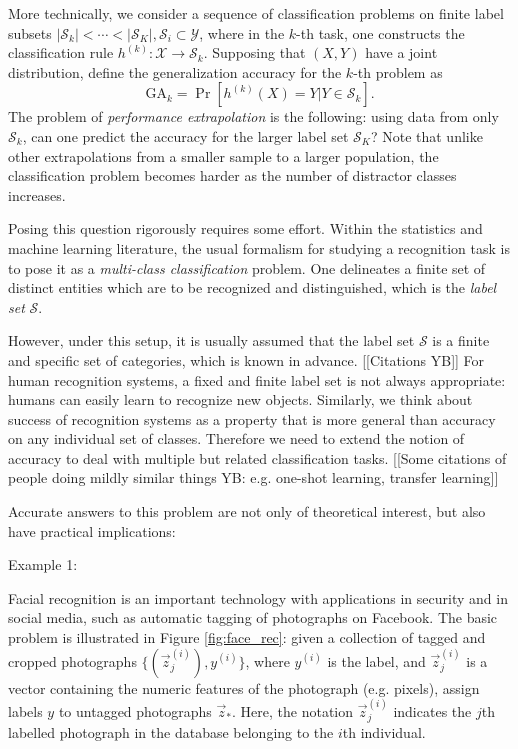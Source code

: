 \documentclass[12pt]{article}
\begin{document}
More technically, we consider a sequence of classification
problems on finite label subsets
$|\mathcal{S}_k| < \cdots < |\mathcal{S}_K|, \mathcal{S}_i \subset \mathcal{Y}$,
where in the $k$-th task, one constructs the classification rule
$h^{(k)}:\mathcal{X} \to \mathcal{S}_k$.  Supposing that $(X, Y)$ have
a joint distribution, define the generalization accuracy for the
$k$-th problem as
\begin{equation}\label{eq:ga_k}
\text{GA}_k = \Pr[h^{(k)}(X) = Y|Y \in \mathcal{S}_k].
\end{equation}
The problem of \emph{performance extrapolation} is the following: using data
from only $\mathcal{S}_k$, can one predict the accuracy 
 for the larger label set $\mathcal{S}_K$?
Note that unlike other extrapolations from a smaller sample to a larger population, 
the classification problem becomes harder as the number of distractor classes
increases. 

Posing this question rigorously requires some effort. 
Within the statistics and machine learning literature, the usual
formalism for studying a recognition task is to pose it as a
\emph{multi-class classification} problem.  One delineates a finite
set of distinct entities which are to be recognized and distinguished,
which is the \emph{label set} $\mathcal{S}$. 

However, under this setup, it is usually assumed that the
label set $\mathcal{S}$ is a finite and specific set of categories, which is known in advance. [[Citations YB]] For human recognition systems, a fixed and finite label set is not always appropriate: humans can easily learn to recognize new objects. Similarly, we think about success of recognition systems as a property that is more general than accuracy on any individual set of classes. Therefore we need to extend the notion of accuracy to deal with multiple but related classification tasks.
[[Some citations of people doing mildly similar things YB: e.g. one-shot learning, transfer learning]] 


Accurate answers to this problem are not only of theoretical interest, but also have practical implications:

Example 1:

Facial recognition is an important technology with applications in
security and in social media, such as automatic tagging of photographs
on Facebook.  The basic problem is illustrated in Figure
\ref{fig:face_rec}: given a collection of tagged and cropped
photographs $\{(\vec{z}_j^{(i)}), y^{(i)}\}$, where $y^{(i)}$ is the
label, and $\vec{z}_j^{(i)}$ is a vector containing the numeric
features of the photograph (e.g. pixels), assign labels $y$ to
untagged photographs $\vec{z}_*$.  Here, the notation
$\vec{z}_j^{(i)}$ indicates the $j$th labelled photograph in the
database belonging to the $i$th individual. 
\end{document}

